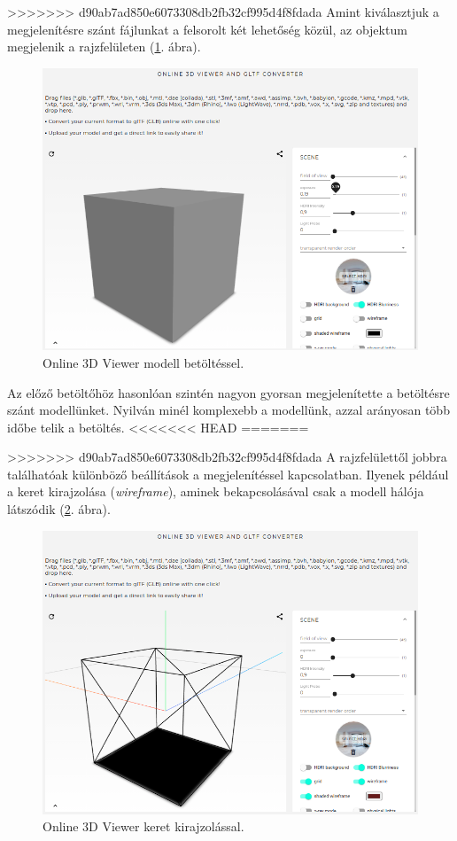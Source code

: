 >>>>>>> d90ab7ad850e6073308db2fb32cf995d4f8fdada
Amint kiválasztjuk a megjelenítésre szánt fájlunkat a felsorolt két lehetőség közül, az objektum megjelenik a rajzfelületen (\ref{fig:3d2}. ábra).

\begin{figure}[h]
\centering
\includegraphics[width=\textwidth]{images/3D_creators_2.png}
\caption{Online 3D Viewer modell betöltéssel.}
\label{fig:3d2}
\end{figure}

Az előző betöltőhöz hasonlóan szintén nagyon gyorsan megjelenítette a betöltésre szánt modellünket. Nyilván minél komplexebb a modellünk, azzal arányosan több időbe telik a betöltés.
<<<<<<< HEAD
 \newpage
=======

>>>>>>> d90ab7ad850e6073308db2fb32cf995d4f8fdada
A rajzfelülettől jobbra találhatóak különböző beállítások a megjelenítéssel kapcsolatban. Ilyenek például a keret kirajzolása (\textit{wireframe}), aminek bekapcsolásával csak a modell hálója látszódik (\ref{fig:3d3}. ábra).

\begin{figure}[h]
\centering
\includegraphics[width=\textwidth]{images/3D_creators_4.png}
\caption{Online 3D Viewer keret kirajzolással.}
\label{fig:3d3}
\end{figure}

